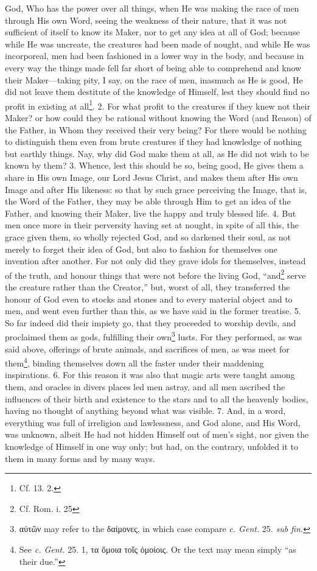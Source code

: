 God, Who has the power over all things, when He was making the race of men through His own Word, seeing the weakness of their nature, that it was not sufficient of itself to know its Maker, nor to get any idea at all of God; because while He was uncreate, the creatures had been made of nought, and while He was incorporeal, men had been fashioned in a lower way in the body, and because in every way the things made fell far short of being able to comprehend and know their Maker—taking pity, I say, on the race of men, inasmuch as He is good, He did not leave them destitute of the knowledge of Himself, lest they should find no profit in existing at all\footnote{Cf. 13. 2.}. 2. For what profit to the creatures if they knew not their Maker? or how could they be rational without knowing the Word (and Reason) of the Father, in Whom they received their very being? For there would be nothing to distinguish them even from brute creatures if they had knowledge of nothing but earthly things. Nay, why did God make them at all, as He did not wish to be known by them? 3. Whence, lest this should be so, being good, He gives them a share in His own Image, our Lord Jesus Christ, and makes them after His own Image and after His likeness: so that by such grace perceiving the Image, that is, the Word of the Father, they may be able through Him to get an idea of the Father, and knowing their Maker, live the happy and truly blessed life. 4. But men once more in their perversity having set at nought, in spite of all this, the grace given them, so wholly rejected God, and so darkened their soul, as not merely to forget their idea of God, but also to fashion for themselves one invention after another. For not only did they grave idols for themselves, instead of the truth, and honour things that were not before the living God, “and\footnote{Cf. Rom. i. 25} serve the creature rather than the Creator,” but, worst of all, they transferred the honour of God even to stocks and stones and to every material object and to men, and went even further than this, as we have said in the former treatise. 5. So far indeed did their impiety go, that they proceeded to worship devils, and proclaimed them as gods, fulfilling their own\footnote{\textgreek{αὐτῶν} may refer to the \textgreek{δαίμονες}, in which case compare \emph{c. Gent.} 25. \emph{sub fin.}} lusts. For they performed, as was said above, offerings of brute animals, and sacrifices of men, as was meet for them\footnote{See \emph{c. Gent.} 25. 1, \textgreek{τα ὅμοια τοῖς ὁμοίοις}. Or the text may mean simply “as their due.”}, binding themselves down all the faster under their maddening inspirations. 6. For this reason it was also that magic arts were taught among them, and oracles in divers places led men astray, and all men ascribed the influences of their birth and existence to the stars and to all the heavenly bodies, having no thought of anything beyond what was visible. 7. And, in a word, everything was full of irreligion and lawlessness, and God alone, and His Word, was unknown, albeit He had not hidden Himself out of men’s sight, nor given the knowledge of Himself in one way only; but had, on the contrary, unfolded it to them in many forms and by many ways.

